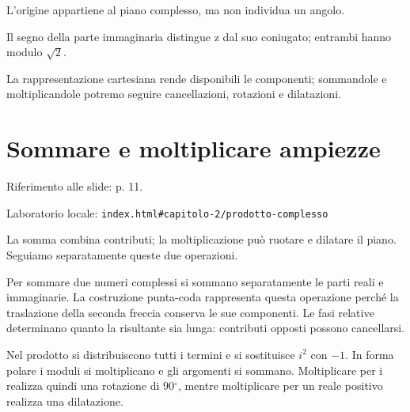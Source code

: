 L'origine appartiene al piano complesso, ma non individua un angolo.\par



Il segno della parte immaginaria distingue z dal suo coniugato; entrambi hanno modulo \(\sqrt{2}\).\par


La rappresentazione cartesiana rende disponibili le componenti; sommandole e moltiplicandole potremo seguire cancellazioni, rotazioni e dilatazioni.\par



\Needspace{.43\textheight}
\section{Sommare e moltiplicare ampiezze}
\label{c2-prodotto-complesso}

{\sffamily\small\color{Ink!70} Riferimento alle slide: p. 11.\par}

{\sffamily\small\color{Ink!70} Laboratorio locale: \nolinkurl{index.html#capitolo-2/prodotto-complesso}\par}

La somma combina contributi; la moltiplicazione può ruotare e dilatare il piano. Seguiamo separatamente queste due operazioni.\par

Per sommare due numeri complessi si sommano separatamente le parti reali e immaginarie. La costruzione punta-coda rappresenta questa operazione perché la traslazione della seconda freccia conserva le sue componenti. Le fasi relative determinano quanto la risultante sia lunga: contributi opposti possono cancellarsi.\par

Nel prodotto si distribuiscono tutti i termini e si sostituisce \(i^{2}\) con \(- 1\). In forma polare i moduli si moltiplicano e gli argomenti si sommano. Moltiplicare per i realizza quindi una rotazione di \(90{}^{\circ} \), mentre moltiplicare per un reale positivo realizza una dilatazione.\par



